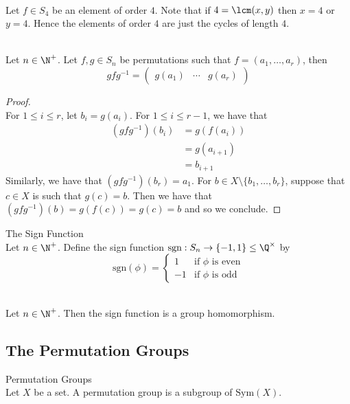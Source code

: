 \documentclass[a4paper]{article}
\begin{document}
\begin{eg}{}{}\\
Let $f\in S_4$ be an element of order $4$. Note that if $4=\lcm(x,y)$ then $x=4$ or $y=4$. Hence the elements of order $4$ are just the cycles of length $4$. 
\end{eg}

\begin{prp}{}{}\\
Let $n\in\N^+$. Let $f,g\in S_n$ be permutations such that $f=(a_1,\dots,a_r)$, then $$gfg^{-1}=\begin{pmatrix}g(a_1) & \cdots & g(a_r)\end{pmatrix}$$ 
\begin{proof}\\
For $1\leq i\leq r$, let $b_i=g(a_i)$. For $1\leq i\leq r-1$, we have that 
\begin{align*}
(gfg^{-1})(b_i)&=g(f(a_i))\\
&=g(a_{i+1})\\
&=b_{i+1}
\end{align*}
Similarly, we have that $(gfg^{-1})(b_r)=a_1$. For $b\in X\setminus\{b_1,\dots,b_r\}$, suppose that $c\in X$ is such that $g(c)=b$. Then we have that $(gfg^{-1})(b)=g(f(c))=g(c)=b$ and so we conclude. 
\end{proof}
\end{prp}

\begin{defn}{The Sign Function}{}\\
Let $n\in\N^+$. Define the sign function $\text{sgn}:S_n\to\{-1,1\}\leq\Q^\times$ by $$\text{sgn}(\phi)=\begin{cases}
1 & \text{if $\phi$ is even}\\
-1 & \text{if $\phi$ is odd}
\end{cases}$$
\end{defn}

\begin{lmm}{}{}\\
Let $n\in\N^+$. Then the sign function is a group homomorphism. 
\end{lmm}

\subsection{The Permutation Groups}
\begin{defn}{Permutation Groups}{}\\
Let $X$ be a set. A permutation group is a subgroup of $\text{Sym}(X)$. 
\end{defn}
\end{document}
